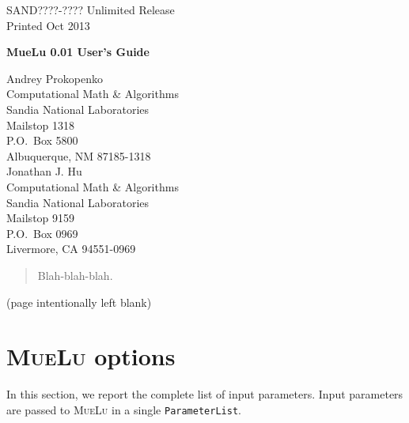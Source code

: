\documentclass{article}[11pt]
\newcommand{\muelu}        {\textsc{MueLu}\xspace}
\newcommand{\parameterlist}{\texttt{ParameterList}\xspace}
\begin{document}
% 
\setcounter{page}{3}

\large

\begin{center}
SAND????-????
Unlimited Release \\
Printed Oct 2013
\end{center}

\vspace{0.2in}

\begin{center}
{\Large {\bf MueLu 0.01 User's Guide}}

\vspace*{0.8in}
Andrey Prokopenko \\
Computational Math \& Algorithms \\
Sandia National Laboratories\\
Mailstop 1318 \\
P.O.~Box 5800 \\
Albuquerque, NM 87185-1318\\[10pt]
Jonathan J. Hu \\
Computational Math \& Algorithms \\
Sandia National Laboratories\\
Mailstop 9159 \\
P.O.~Box 0969 \\
Livermore, CA 94551-0969


\vspace*{1in}

\end{center}

\begin{abstract}

Blah-blah-blah.

\end{abstract}

\clearpage
\newpage

\vfill
\begin{center}
(page intentionally left blank)
\end{center}
\clearpage
\newpage


\tableofcontents
\newpage

\section{\muelu options}
In this section, we report the complete list of input parameters. Input parameters are passed to \muelu in a single \parameterlist.
\end{document}
